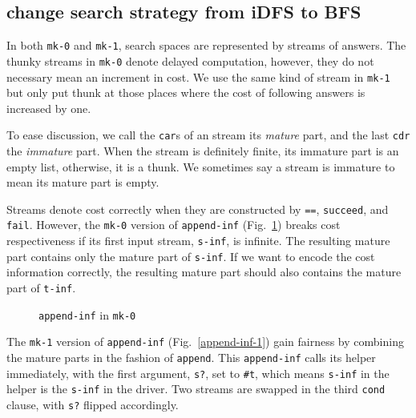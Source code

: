 \documentclass[format=acmlarge, review=true, authordraft=true]{acmart}
\begin{document}

\subsection{change search strategy from iDFS to BFS}

In both \texttt{mk-0} and \texttt{mk-1}, search spaces are represented by 
streams of  answers. The thunky streams in \texttt{mk-0} denote delayed 
computation, however, they do not necessary mean an increment in cost. We use 
the same kind of stream in \texttt{mk-1} but only put thunk at those places 
where the cost of following answers is increased by one.

To ease discussion, we call the \texttt{car}s of an stream its \emph{mature} 
part, and the last \texttt{cdr} the \emph{immature} part. When the stream is 
definitely finite, its immature part is an empty list, otherwise, it is a 
thunk. We sometimes say a stream is immature to mean its mature part is empty.

Streams denote cost correctly when they are constructed by \texttt{==}, 
\texttt{succeed}, and \texttt{fail}. However, the \texttt{mk-0} version of 
\texttt{append-inf} (Fig.~\ref{append-inf-0}) breaks cost respectiveness if its 
first input stream, \texttt{s-inf},  is infinite. The resulting mature part 
contains only the mature part of \texttt{s-inf}. If we want to encode the 
cost information correctly, the resulting mature part should also contains the 
mature part of \texttt{t-inf}.

\begin{figure}
	 	
	 \caption{\texttt{append-inf} in \texttt{mk-0}}
	 \label{append-inf-0}
\end{figure}

The \texttt{mk-1} version of \texttt{append-inf} (Fig.~\ref{append-inf-1}) 
gain fairness by combining the mature parts in the fashion of \texttt{append}. 
This \texttt{append-inf} calls its helper immediately, with the first argument, 
\texttt{s?}, set to \texttt{\#{}t}, which means \texttt{s-inf} in the helper is 
the \texttt{s-inf} in the driver. Two streams are swapped in the third 
\texttt{cond} clause, with \texttt{s?} flipped accordingly.
\end{document}
